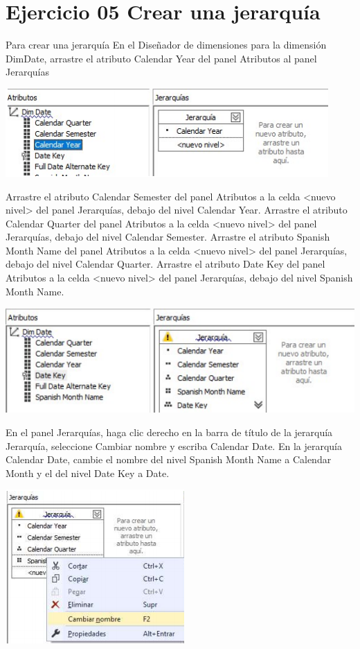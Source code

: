 \section{Ejercicio 05 Crear una jerarquía}

Para crear una jerarquía
En el Diseñador de dimensiones para la dimensión DimDate, arrastre el atributo Calendar Year del panel
Atributos al panel Jerarquías

	\begin{center}
	\includegraphics[width=0.5\columnwidth]{images/task2/11}
    \end{center}	
    
Arrastre el atributo Calendar Semester del panel Atributos a la celda <nuevo nivel> del panel Jerarquías, debajo del nivel Calendar Year. 
 Arrastre el atributo Calendar Quarter del panel Atributos a la celda <nuevo nivel> del panel Jerarquías, debajo del nivel Calendar Semester.
 Arrastre el atributo Spanish Month Name del panel Atributos a la celda <nuevo nivel> del panel Jerarquías, debajo del nivel Calendar Quarter. 
 Arrastre el atributo Date Key del panel Atributos a la celda <nuevo nivel> del panel Jerarquías, debajo del nivel
Spanish Month Name.

	\begin{center}
	\includegraphics[width=0.5\columnwidth]{images/task2/12}
    \end{center}	

En el panel Jerarquías, haga clic derecho en la barra de título de la jerarquía Jerarquía, seleccione Cambiar nombre
y escriba Calendar Date.
En la jerarquía Calendar Date, cambie el nombre del nivel Spanish Month Name a Calendar Month y el del nivel
Date Key a Date.    
    
    
	\begin{center}
	\includegraphics[width=0.25\columnwidth]{images/task2/13}
    \end{center}	       
    
